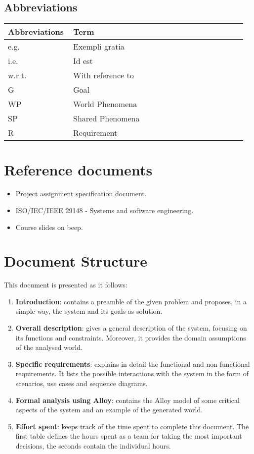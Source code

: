 \subsection{Abbreviations}
\begin{center}
	\begin{tabular}{@{}p{0.25\linewidth} p{0.71\linewidth}@{}}
		\toprule
		\textbf{Abbreviations} & \textbf{Term}\\
		\midrule
		e.g. & Exempli gratia\\
		i.e. & Id est\\
		w.r.t. & With reference to\\
		G & Goal\\
		WP & World Phenomena\\
		SP & Shared Phenomena\\
        R & Requirement\\
		\bottomrule
	\end{tabular}
\end{center}

\section{Reference documents}
\begin{itemize}
	\item Project assignment specification document.
	\item ISO/IEC/IEEE 29148 - Systems and software engineering.
	\item Course slides on beep.
\end{itemize}

\section{Document Structure}
This document is presented as it follows:
\begin{enumerate}
	\item \textbf{Introduction}: contains a preamble of the given problem and proposes, in a simple way, the system and its goals as solution.

	\item \textbf{Overall description}: gives a general description of the system, focusing on its functions and constraints. Moreover, it provides the domain assumptions of the analysed world.

	\item \textbf{Specific requirements}: explains in detail the functional and non functional requirements. It lists the possible interactions with the system in the form of scenarios, use cases and sequence diagrams.

	\item \textbf{Formal analysis using Alloy}: contains the Alloy model of some critical aspects of the system and an example of the generated world.

	\item \textbf{Effort spent}: keeps track of the time spent to complete this document. The first table defines the hours spent	as a team for taking the most important decisions, the seconds contain the individual hours.
\end{enumerate}

